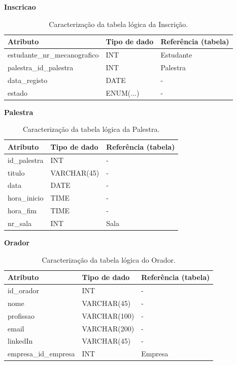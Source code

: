 \documentclass[12pt,a4paper]{article}
\renewcommand{\arraystretch}{1.5}  %
\begin{document}
\begin{table}[h]
\textbf{Inscricao}

\centering
\renewcommand{\arraystretch}{1.2}
\begin{tabularx}{\textwidth}{|X|l|X|}
\hline
\textbf{Atributo} & \textbf{Tipo de dado} & \textbf{Referência (tabela)} \\ \hline

estudante\_nr\_mecanografico & INT & Estudante \\ \hline
palestra\_id\_palestra & INT & Palestra\\ \hline
data\_registo & DATE & - \\ \hline
estado & ENUM(...) & - \\ \hline
\end{tabularx}
\caption{Caracterização da tabela lógica da Inscrição.}
\end{table}

\begin{table}[H]
\textbf{Palestra}

\centering
\renewcommand{\arraystretch}{1.2}
\begin{tabularx}{\textwidth}{|X|l|X|}
\hline
\textbf{Atributo} & \textbf{Tipo de dado} & \textbf{Referência (tabela)} \\ \hline

id\_palestra & INT & - \\ \hline
titulo & VARCHAR(45) & -\\ \hline
data & DATE & - \\ \hline
hora\_inicio & TIME & - \\ \hline
hora\_fim& TIME & - \\ \hline
nr\_sala & INT & Sala \\ \hline
\end{tabularx}
\caption{Caracterização da tabela lógica da Palestra.}
\end{table}

\begin{table}[H]
\textbf{Orador}

\centering
\renewcommand{\arraystretch}{1.2}
\begin{tabularx}{\textwidth}{|X|l|X|}
\hline
\textbf{Atributo} & \textbf{Tipo de dado} & \textbf{Referência (tabela)} \\ \hline

id\_orador & INT & - \\ \hline
nome & VARCHAR(45) & -\\ \hline
profissao & VARCHAR(100) & - \\ \hline
email & VARCHAR(200) & - \\ \hline
linkedIn & VARCHAR(45) & - \\ \hline
empresa\_id\_empresa & INT & Empresa \\ \hline
\end{tabularx}
\caption{Caracterização da tabela lógica do Orador.}
\end{table}
\end{document}
